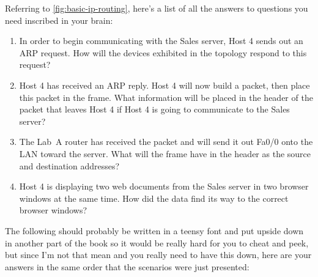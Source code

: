 Referring to \cref{fig:basic-ip-routing}, here's a list of all the answers to questions you need inscribed in your brain:

\begin{enumerate}
\item
   In order to begin communicating with the Sales server, Host 4 sends out an ARP request.
   How will the devices exhibited in the topology respond to this request?
\item
  Host 4 has received an ARP reply. Host 4 will now build a packet, then
  place this packet in the frame. What information will be placed in the
  header of the packet that leaves Host 4 if Host 4 is going to
  communicate to the Sales server?
\item
  The Lab~A router has received the packet and will send it out Fa0/0
  onto the LAN toward the server. What will the frame have in the header
  as the source and destination addresses?
\item
  Host 4 is displaying two web documents from the Sales server in two
  browser windows at the same time. How did the data find its way to the
  correct browser windows?
\end{enumerate}

The following should probably be written in a teensy font and put upside
down in another part of the book so it would be really hard for you to
cheat and peek, but since I'm not that mean and you really need to have
this down, here are your answers in the same order that the scenarios
were just presented:

